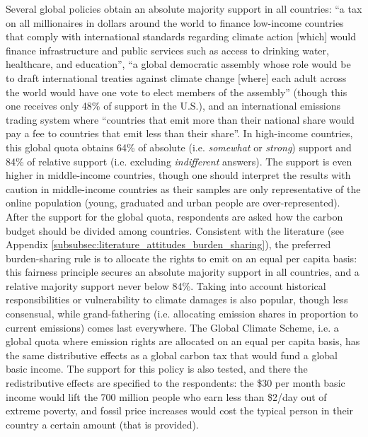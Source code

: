Several global policies obtain an absolute majority %
support in all countries: ``a tax on all millionaires in dollars around the world to finance low-income countries that comply with international standards regarding climate action [which] would finance infrastructure and public services such as access to drinking water, healthcare, and education'', %
``a global democratic assembly whose role would be to draft international treaties against climate change [where] each adult across the world would have one vote to elect members of the assembly'' (though this one receives only 48\% of support in the U.S.), %
and an international emissions trading system where ``countries that emit more than their national share would pay a fee to countries that emit less than their share''. 
In high-income countries, this global quota obtains 64\% of absolute (i.e. \textit{somewhat} or \textit{strong}) support and 84\% of relative support (i.e. excluding \textit{indifferent} answers). The support is even higher in middle-income countries, though one should interpret the results with caution in middle-income countries as their samples are only representative of the online population (young, graduated and urban people are over-represented). 
After the support for the global quota, respondents are asked how the carbon budget should be divided among countries. 
Consistent with the literature (see Appendix \ref{subsubsec:literature_attitudes_burden_sharing}), the preferred burden-sharing rule is to allocate the rights to emit on an equal per capita basis: this fairness principle secures an absolute majority support in all countries, and a relative majority support never below 84\%. 
Taking into account historical responsibilities or vulnerability to climate damages is also popular, though less consensual, while grand-fathering (i.e. allocating emission shares in proportion to current emissions) comes last everywhere. 
The Global Climate Scheme, i.e. a global quota where emission rights are allocated on an equal per capita basis, has the same distributive effects as a global carbon tax that would fund a global basic income. The support for this policy is also tested, and there the redistributive effects are specified to the respondents: the \$30 per month basic income would lift the 700 million people who earn less than \$2/day out of extreme poverty, and fossil price increases would cost the typical person in their country a certain amount (that is provided).  %
